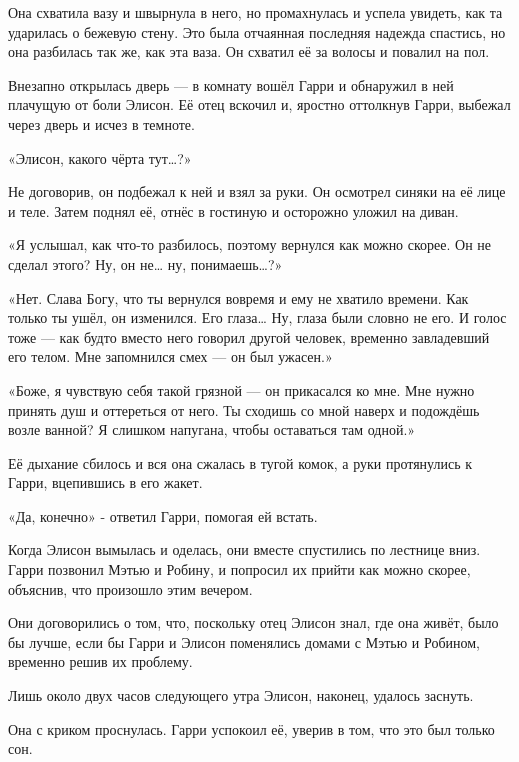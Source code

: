 \documentclass[a4paper,12pt]{book}
\begin{document}
\par
Она схватила вазу и швырнула в него, но промахнулась и успела увидеть, как та ударилась о бежевую стену. Это была отчаянная последняя надежда спастись, но она разбилась так же, как эта ваза. Он схватил её за волосы и повалил на пол.\\
\par
Внезапно открылась дверь — в комнату вошёл Гарри и обнаружил в ней плачущую от боли Элисон. Её отец вскочил и, яростно оттолкнув Гарри, выбежал через дверь и исчез в темноте.
\par
«Элисон, какого чёрта тут…?»
\par
Не договорив, он подбежал к ней и взял за руки. Он осмотрел синяки на её лице и теле. Затем поднял её, отнёс в гостиную и осторожно уложил на диван.
\par
«Я услышал, как что-то разбилось, поэтому вернулся как можно скорее. Он не сделал этого? Ну, он не… ну, понимаешь…?»
\par
«Нет. Слава Богу, что ты вернулся вовремя и ему не хватило времени. Как только ты ушёл, он изменился. Его глаза… Ну, глаза были словно не его. И голос тоже — как будто вместо него говорил другой человек, временно завладевший его телом. Мне запомнился смех — он был ужасен.»
\par
«Боже, я чувствую себя такой грязной — он прикасался ко мне. Мне нужно принять душ и оттереться от него. Ты сходишь со мной наверх и подождёшь возле ванной? Я слишком напугана, чтобы оставаться там одной.»
\par
Её дыхание сбилось и вся она сжалась в тугой комок, а руки протянулись к Гарри, вцепившись в его жакет.
\par
«Да, конечно» - ответил Гарри, помогая ей встать.\\
\par
Когда Элисон вымылась и оделась, они вместе спустились по лестнице вниз. Гарри позвонил Мэтью и Робину, и попросил их прийти как можно скорее, объяснив, что произошло этим вечером.
\par
Они договорились о том, что, поскольку отец Элисон знал, где она живёт, было бы лучше, если бы Гарри и Элисон поменялись домами с Мэтью и Робином, временно решив их проблему.
\par
Лишь около двух часов следующего утра Элисон, наконец, удалось заснуть.\\
\par
Она с криком проснулась. Гарри успокоил её, уверив в том, что это был только сон.
\par
\end{document}
